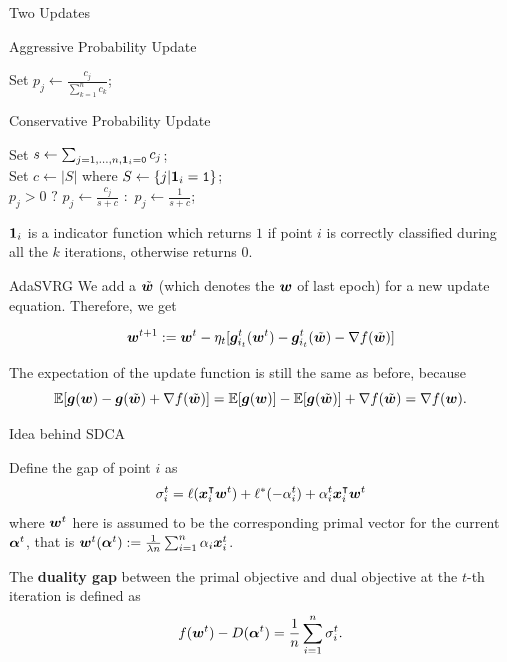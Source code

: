 \begin{frame}{Two Updates}
\begin{algorithm}[H]
    \label{alg:AggUpdate}
    \caption{Aggressive Probability Update}
    \SetAlgoLined
     {
	Set $p_j \leftarrow \frac{c_j}{\sum_{k=1}^n c_k}$;
    }
    \end{algorithm}
\begin{algorithm}[H]    
    \label{alg:ConUpdate}
    \caption{Conservative Probability Update}
    \SetAlgoLined
    Set $s \leftarrow \sum_{j=1,\dots, n, \bm{1}_i=\texttt{0}} c_j$; \\
    Set $c \leftarrow |S|$ where $S \leftarrow \{j | \bm{1}_i=\texttt{1}\}$; \\
     {
	    $p_j>0$ $?$ {$p_j \leftarrow \frac{c_j}{s+c}$} $\colon$ {$p_j \leftarrow \frac{1}{s+c}$; } 
    } 
\end{algorithm} 
\Tiny $\bm{1}_i$ is a indicator function which returns $1$ if point $i$ is correctly classified during all the $k$ iterations, otherwise returns $0$.
\end{frame}

\begin{frame}{AdaSVRG}
We add a $\tilde{\bm{w}}$ (which denotes the $\bm{w}$ of last epoch) for a new update equation. Therefore, we get

\begin{equation*}\label{eq:vr_w_update}
    \bm{w}^{t+1} := \bm{w}^{t}-\eta_t [\bm{g}_{i_t}^t(\bm{w}^{t}) - \bm{g}_{i_t}^t(\tilde{\bm{w}}) - \nabla f(\tilde{\bm{w}})]
\end{equation*}

The expectation of the update function is still the same as before, because
\[
    \mathbb{E}[\bm{g}(\bm{w}) - \bm{g}(\tilde{\bm{w}}) + \nabla f(\tilde{\bm{w}})] = \mathbb{E}[\bm{g}(\bm{w})] - \mathbb{E}[\bm{g}(\tilde{\bm{w}})] + \nabla f(\tilde{\bm{w}}) = \nabla f(\bm{w}).
\]
\end{frame}

\begin{frame}{Idea behind SDCA}
\begin{definition}{Define the gap of point $i$ as} 
\[
\sigma_i^t =  \ell(\bm{x}_i^\intercal\bm{w}^{t})+\ell^*(-\alpha_i^{t})+\alpha_i^{t}\bm{x}_i^\intercal\bm{w}^{t} 
\]
where $\bm{w}^t$ here is assumed to be the corresponding primal vector for the current $\bm{\alpha}^t$, that is $\bm{w}^t(\bm{\alpha}^t) := \frac{1}{\lambda n}\sum_{i=1}^n \alpha_i \bm{x}_i^t$.
\end{definition}

The \textbf{duality gap} between the primal objective and dual objective at the $t$-th iteration is defined as
\[
    f(\bm{w}^{t})-D(\bm{\alpha}^{t}) = \frac{1}{n} \sum_{i=1}^n \sigma_i^t.
\]
\end{frame}

